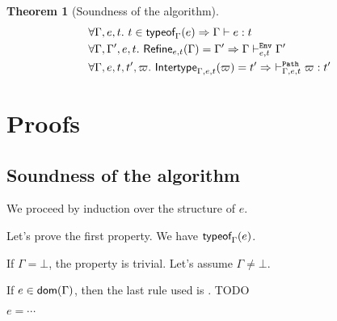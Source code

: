 \documentclass[a4paper]{article}
\theoremstyle{definition}
\newtheorem{theorem}{Theorem}
\newtheorem{lemma}{Lemma}
\begin{document}
%

  \begin{theorem}[Soundness of the algorithm]
    \begin{align*}
      &\forall \Gamma, e, t.\ t\in\textsf{typeof}_{\Gamma}(e) \Rightarrow \Gamma \vdash e:t\\
      &\forall \Gamma, \Gamma', e, t.\ \textsf{Refine}_{e,t}(\Gamma) = \Gamma' \Rightarrow \Gamma \vdash^{\texttt{Env}}_{e,t} \Gamma'\\
      &\forall \Gamma, e, t, t', \varpi.\ \textsf{Intertype}_{\Gamma,e,t} (\varpi) = t' \Rightarrow\ \vdash^{\texttt{Path}}_{\Gamma,e,t} \varpi:t'
    \end{align*}
  \end{theorem}

  \section{Proofs}

  \subsection{Soundness of the algorithm}

  We proceed by induction over the structure of $e$.

  Let's prove the first property.
  We have $\textsf{typeof}_{\Gamma}(e)$.

  If $\Gamma = \bot$, the property is trivial. Let's assume $\Gamma \neq \bot$.

  If $e\in\textsf{dom}(\Gamma)$, then the last rule used is . TODO

  \begin{description}
    \item[$e=\cdots$]
  \end{description}
\end{document}
